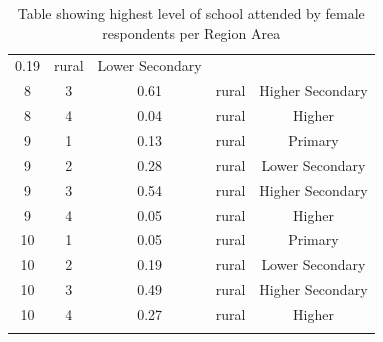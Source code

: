 \documentclass[stu, 12pt, floatsintext,longtable]{apa7}
\begin{document}
\begin{longtable}{ccccc}
    0.19                                               &
    rural                                              & Lower Secondary
    \\
    8                                                  & 3                    &
    0.61                                               &
    rural                                              & Higher Secondary
    \\
    8                                                  & 4                    &
    0.04                                               &
    rural                                              & Higher
    \\
    9                                                  & 1                    &
    0.13                                               &
    rural                                              & Primary
    \\
    9                                                  & 2                    &
    0.28                                               &
    rural                                              & Lower Secondary
    \\
    9                                                  & 3                    &
    0.54                                               &
    rural                                              & Higher Secondary
    \\
    9                                                  & 4                    &
    0.05                                               &
    rural                                              & Higher
    \\
    10                                                 & 1                    &
    0.05                                               &
    rural                                              & Primary
    \\
    10                                                 & 2                    &
    0.19                                               &
    rural                                              & Lower Secondary
    \\
    10                                                 & 3                    &
    0.49                                               &
    rural                                              & Higher Secondary
    \\
    10                                                 & 4                    &
    0.27                                               &
    rural                                              & Higher
    \\
    \bottomrule
    \caption{Table showing highest level of school attended by female
        respondents
        per Region Area}
\end{longtable}
\end{document}
